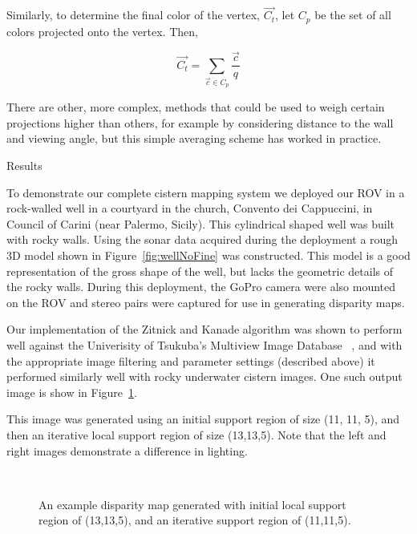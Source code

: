 \documentclass[twocolumn]{article}
\makeatletter
\def\section{\@startsection{section}{1}{\z@}{24pt plus 2 pt
minus 2 pt} {12pt plus 2pt minus 2pt}{\large\bf}}
\makeatother
\begin{document}
Similarly, to determine the final color of the vertex, $\vec{C_t}$, let $C_p$ be the set of all colors projected onto the vertex. Then,

\begin{equation}
\vec{C_t} = \sum\limits_{\vec{c} \in C_p} \frac{\vec{c}}{q} 
\label{eq:colorBlend}
\end{equation}

There are other, more complex, methods that could be used to weigh certain projections higher than others, for example by considering distance to the wall and viewing angle, but this simple averaging scheme has worked in practice. 

\section{Results}
\label{sec:results}

To demonstrate our complete cistern mapping system we deployed our ROV in a rock-walled well in a courtyard in the church, Convento dei Cappuccini, in Council of Carini (near Palermo, Sicily).
This cylindrical shaped well was built with rocky walls.  Using the sonar data acquired during the deployment a rough 3D model shown in Figure~\ref{fig:wellNoFine} was constructed.  This model is a good representation of the gross shape of the well, but lacks the geometric details of the rocky walls.  During this deployment, the GoPro camera were also mounted on the ROV and stereo pairs were captured for use in generating disparity maps.

Our implementation of the Zitnick and Kanade algorithm was shown to perform well against the Univerisity of Tsukuba's Multiview Image Database ~\cite{stereo:zitKan}, and with the appropriate image filtering and parameter settings (described above) it performed similarly well with rocky underwater cistern images.
One such output image is show in Figure~\ref{fig:disparity}.

This image was generated using an initial support region of size (11, 11, 5), and then an iterative local support region of size (13,13,5).
Note that the left and right images demonstrate a difference in lighting.

\begin{figure}[!h]
	\centering
		\quad %
		\\%
		\medskip
		\caption{An example disparity map generated with initial local support region of (13,13,5), and an iterative support region of (11,11,5).}
		\label{fig:disparity}
\end{figure}
\end{document}
